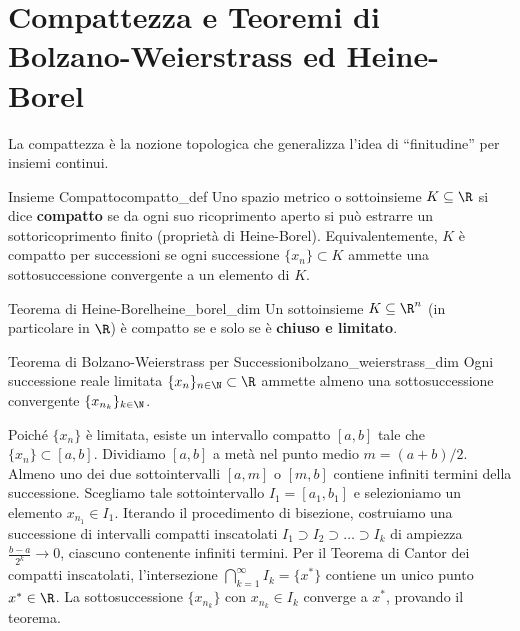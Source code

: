 \section{Compattezza e Teoremi di Bolzano-Weierstrass ed Heine-Borel}
\label{sec:compattezza_teoria}

La compattezza è la nozione topologica che generalizza l'idea di ``finitudine'' per insiemi continui.

\begin{definizione}{Insieme Compatto}{compatto_def}
Uno spazio metrico o sottoinsieme $K \subseteq \R$ si dice \textbf{compatto} se da ogni suo ricoprimento aperto si può estrarre un sottoricoprimento finito (proprietà di Heine-Borel).
Equivalentemente, $K$ è compatto per successioni se ogni successione $\{x_n\} \subset K$ ammette una sottosuccessione convergente a un elemento di $K$.
\end{definizione}

\begin{teorema}{Teorema di Heine-Borel}{heine_borel_dim}
Un sottoinsieme $K \subseteq \R^n$ (in particolare in $\R$) è compatto se e solo se è \textbf{chiuso e limitato}.
\end{teorema}

\begin{teorema}{Teorema di Bolzano-Weierstrass per Successioni}{bolzano_weierstrass_dim}
Ogni successione reale limitata $\{x_n\}_{n \in \N} \subset \R$ ammette almeno una sottosuccessione convergente $\{x_{n_k}\}_{k \in \N}$.
\end{teorema}

\begin{dimostrazione}
Poiché $\{x_n\}$ è limitata, esiste un intervallo compatto $[a, b]$ tale che $\{x_n\} \subset [a, b]$.
Dividiamo $[a, b]$ a metà nel punto medio $m = (a+b)/2$. Almeno uno dei due sottointervalli $[a, m]$ o $[m, b]$ contiene infiniti termini della successione. Scegliamo tale sottointervallo $I_1 = [a_1, b_1]$ e selezioniamo un elemento $x_{n_1} \in I_1$.
Iterando il procedimento di bisezione, costruiamo una successione di intervalli compatti inscatolati $I_1 \supset I_2 \supset \dots \supset I_k$ di ampiezza $\frac{b-a}{2^k} \to 0$, ciascuno contenente infiniti termini.
Per il Teorema di Cantor dei compatti inscatolati, l'intersezione $\bigcap_{k=1}^\infty I_k = \{x^*\}$ contiene un unico punto $x^* \in \R$.
La sottosuccessione $\{x_{n_k}\}$ con $x_{n_k} \in I_k$ converge a $x^*$, provando il teorema.
\end{dimostrazione}

